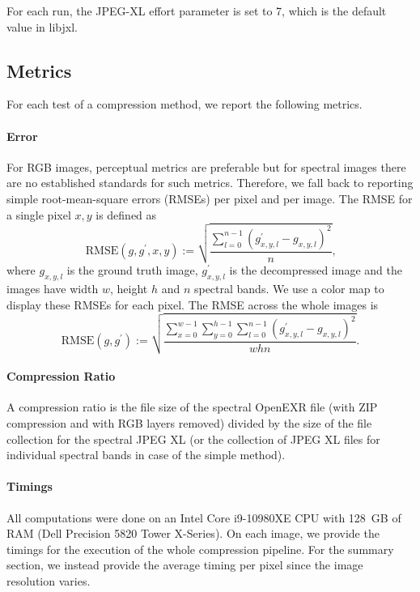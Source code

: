 For each run, the JPEG-XL effort parameter is set to 7, which is the default value in libjxl.


\subsection{Metrics}

For each test of a compression method, we report the following metrics.

\paragraph{Error}

For RGB images, perceptual metrics are preferable but for spectral images there are no established standards for such metrics.
Therefore, we fall back to reporting simple root-mean-square errors (RMSEs) per pixel and per image.
The RMSE for a single pixel $x,y$ is defined as
\begin{equation}
    \mathrm{RMSE}(g,g^{\prime},x,y):=\sqrt{\frac{\sum_{l=0}^{n-1}(g_{x,y,l}^{\prime}-g_{x,y,l})^{2}}{n}} \text{,}
\end{equation}
where $g_{x,y,l}$ is the ground truth image, $g^\prime_{x,y,l}$ is the decompressed image and the images have width $w$, height $h$ and $n$ spectral bands.
We use a color map to display these RMSEs for each pixel.
The RMSE across the whole images is
\begin{equation}
    \mathrm{RMSE}(g,g^{\prime}):=\sqrt{\frac{\sum_{x=0}^{w-1}\sum_{y=0}^{h-1}\sum_{l=0}^{n-1}(g_{x,y,l}^{\prime}-g_{x,y,l})^{2}}{whn}} \text{.}
\end{equation}


\paragraph{Compression Ratio}

A compression ratio is the file size of the spectral OpenEXR file (with ZIP compression and with RGB layers removed) divided by the size of the file collection for the spectral JPEG XL (or the collection of JPEG XL files for individual spectral bands in case of the simple method).


\paragraph{Timings}

All computations were done on an Intel Core i9-10980XE CPU with 128~GB of RAM (Dell Precision 5820 Tower X-Series).
On each image, we provide the timings for the execution of the whole compression pipeline.
For the summary section, we instead provide the average timing per pixel since the image resolution varies.



